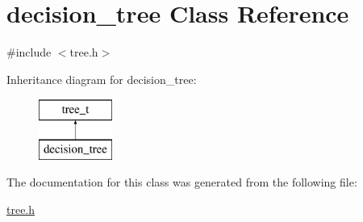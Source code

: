 \hypertarget{classdecision__tree}{\section{decision\+\_\+tree Class Reference}
\label{classdecision__tree}
}


{\ttfamily \#include $<$tree.\+h$>$}

Inheritance diagram for decision\+\_\+tree\+:\begin{figure}[H]
\begin{center}
\leavevmode
\includegraphics[height=2.000000cm]{classdecision__tree}
\end{center}
\end{figure}


The documentation for this class was generated from the following file\+:\begin{DoxyCompactItemize}
\item 
\hyperlink{tree_8h}{tree.\+h}\end{DoxyCompactItemize}
